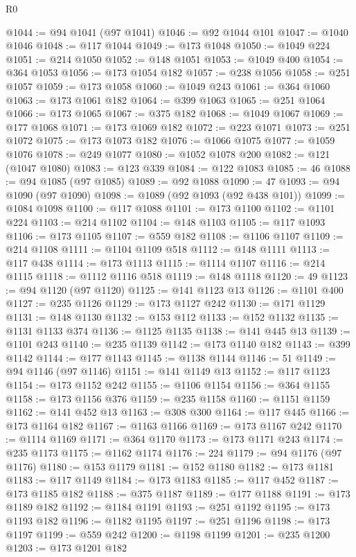 \begin{lexlean}{R0}
\begin{coremodule}
@1044 := @94 @1041 (@97 @1041)
@1046 := @92 @1044 @101
@1047 := @1040 @1046
@1048 := @117 @1044
@1049 := @173 @1048
@1050 := @1049 @224
@1051 := @214 @1050
@1052 := @148 @1051
@1053 := @1049 @400
@1054 := @364 @1053
@1056 := @173 @1054 @182
@1057 := @238 @1056
@1058 := @251 @1057
@1059 := @173 @1058
@1060 := @1049 @243
@1061 := @364 @1060
@1063 := @173 @1061 @182
@1064 := @399 @1063
@1065 := @251 @1064
@1066 := @173 @1065
@1067 := @375 @182
@1068 := @1049 @1067
@1069 := @177 @1068
@1071 := @173 @1069 @182
@1072 := @223 @1071
@1073 := @251 @1072
@1075 := @173 @1073 @182
@1076 := @1066 @1075
@1077 := @1059 @1076
@1078 := @249 @1077
@1080 := @1052 @1078 @200
@1082 := @121 (@1047 @1080)
@1083 := @123 @339
@1084 := @122 @1083
@1085 := 46
@1088 := @94 @1085 (@97 @1085)
@1089 := @92 @1088
@1090 := 47
@1093 := @94 @1090 (@97 @1090)
@1098 := @1089 (@92 @1093 (@92 @438 @101))
@1099 := @1084 @1098
@1100 := @117 @1088
@1101 := @173 @1100
@1102 := @1101 @224
@1103 := @214 @1102
@1104 := @148 @1103
@1105 := @117 @1093
@1106 := @173 @1105
@1107 := @559 @182
@1108 := @1106 @1107
@1109 := @214 @1108
@1111 := @1104 @1109 @518
@1112 := @148 @1111
@1113 := @117 @438
@1114 := @173 @1113
@1115 := @1114 @1107
@1116 := @214 @1115
@1118 := @1112 @1116 @518
@1119 := @148 @1118
@1120 := 49
@1123 := @94 @1120 (@97 @1120)
@1125 := @141 @1123 @13
@1126 := @1101 @400
@1127 := @235 @1126
@1129 := @173 @1127 @242
@1130 := @171 @1129
@1131 := @148 @1130
@1132 := @153 @112
@1133 := @152 @1132
@1135 := @1131 @1133 @374
@1136 := @1125 @1135
@1138 := @141 @445 @13
@1139 := @1101 @243
@1140 := @235 @1139
@1142 := @173 @1140 @182
@1143 := @399 @1142
@1144 := @177 @1143
@1145 := @1138 @1144
@1146 := 51
@1149 := @94 @1146 (@97 @1146)
@1151 := @141 @1149 @13
@1152 := @117 @1123
@1154 := @173 @1152 @242
@1155 := @1106 @1154
@1156 := @364 @1155
@1158 := @173 @1156 @376
@1159 := @235 @1158
@1160 := @1151 @1159
@1162 := @141 @452 @13
@1163 := @308 @300
@1164 := @117 @445
@1166 := @173 @1164 @182
@1167 := @1163 @1166
@1169 := @173 @1167 @242
@1170 := @1114 @1169
@1171 := @364 @1170
@1173 := @173 @1171 @243
@1174 := @235 @1173
@1175 := @1162 @1174
@1176 := 224
@1179 := @94 @1176 (@97 @1176)
@1180 := @153 @1179
@1181 := @152 @1180
@1182 := @173 @1181
@1183 := @117 @1149
@1184 := @173 @1183
@1185 := @117 @452
@1187 := @173 @1185 @182
@1188 := @375 @1187
@1189 := @177 @1188
@1191 := @173 @1189 @182
@1192 := @1184 @1191
@1193 := @251 @1192
@1195 := @173 @1193 @182
@1196 := @1182 @1195
@1197 := @251 @1196
@1198 := @173 @1197
@1199 := @559 @242
@1200 := @1198 @1199
@1201 := @235 @1200
@1203 := @173 @1201 @182

\end{coremodule}
\end{lexlean}

